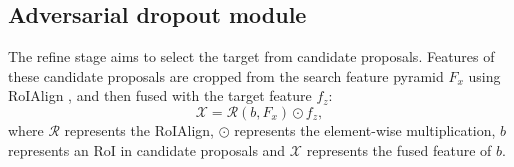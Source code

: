 \documentclass{article}
\begin{document}
\subsection{Adversarial dropout module}
\label{sec:stage2}
The refine stage aims to select the target from candidate proposals.
Features of these candidate proposals are cropped from the search feature pyramid $F_{x}$ using RoIAlign \cite{he2017mask}, and then fused with the target feature $f_{z}$:
\begin{equation}
    \mathcal{X} = \mathcal{R}(b, F_{x}) \odot f_{z},
\end{equation}
where $\mathcal{R}$ represents the RoIAlign, $\odot$ represents the element-wise multiplication, $b$ represents an RoI in candidate proposals and $\mathcal{X}$ represents the fused feature of $b$.
\end{document}
